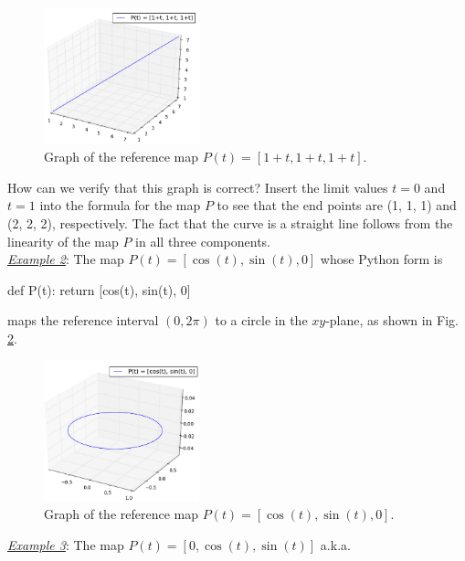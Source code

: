 \begin{figure}[!ht]
\begin{center}
\includegraphics[width=0.4\textwidth]{img/paramcu1.png}
\end{center}
\vspace{-6mm}
\caption{Graph of the reference map $P(t) = [1+t, 1+t, 1+t]$.}
\vspace{-1cm}
\label{fig:paramcu1}
\end{figure}
\newpage
\noindent
How can we verify that this graph is correct? 
Insert the limit values $t = 0$ and $t = 1$ into the formula for the map $P$ 
to see that the end points are (1, 1, 1) and (2, 2, 2), respectively. The 
fact that the curve is a straight line follows from the linearity of the 
map $P$ in all three components. \\

\noindent
\underline{\em Example 2}: The map
$
P(t) = [\cos(t), \sin(t), 0]
$
whose Python form is

\begin{bbox}
def P(t): return [cos(t), sin(t), 0]
\end{bbox}
maps the reference interval $(0, 2\pi)$ to a circle in the 
$xy$-plane, as shown in Fig. \ref{fig:paramcu2}.

\begin{figure}[!ht]
\begin{center}
\includegraphics[width=0.4\textwidth]{img/paramcu2.png}
\end{center}
\vspace{-6mm}
\caption{Graph of the reference map $P(t) = [\cos(t), \sin(t), 0]$.}
\label{fig:paramcu2}
\end{figure}
\noindent
\noindent
\underline{\em Example 3}: The map
$
P(t) = [0, \cos(t), \sin(t)]
$
a.k.a.

